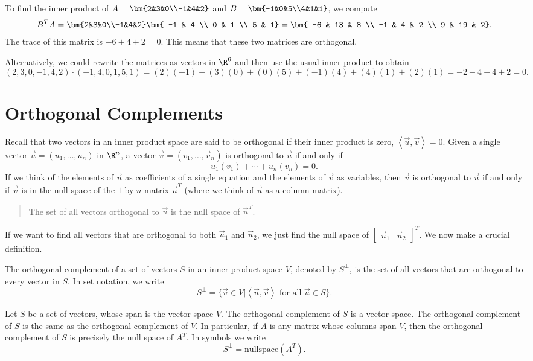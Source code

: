 \begin{example}
To find the inner product of $A=\bm{2&3&0\\-1&4&2}$ and $B=\bm{-1&0&5\\4&1&1}$, we compute 
$$B^TA = \bm{2&3&0\\-1&4&2}\bm{ -1 & 4 \\ 0 & 1 \\ 5 & 1}= \bm{ -6 & 13 & 8 \\ -1 & 4 & 2 \\ 9 & 19 & 2}.$$
The trace of this matrix is $-6 +4 +2 = 0$. This means that these two matrices are orthogonal.

Alternatively, we could rewrite the matrices as vectors in $\R^6$ and then use the usual inner product to obtain $$(2,3,0,-1,4,2)\cdot (-1,4,0,1,5,1) = (2)(-1)+(3)(0)+(0)(5)+(-1)(4)+(4)(1)+(2)(1)= -2-4+4+2 =0.$$
\end{example}






\section{Orthogonal Complements}
Recall that two vectors in an inner product space are said to be orthogonal if their inner product is zero, $\left<\vec u,\vec v\right>=0$.  
Given a single vector $\vec u = (u_1,\ldots,u_n)$ in $\R^n$, a vector $\vec v = (v_1,\ldots,\vec v_n)$ is orthogonal to $\vec u$ if and only if $$u_1(v_1)+\cdots +u_n(v_n)=0.$$ 
If we think of the elements of $\vec u$ as coefficients of a single equation and the elements of $\vec v$ as variables, 
then $\vec v$ is orthogonal to $\vec u$ if and only if $\vec v$ is in the null space of the $1$ by $n$ matrix $\vec u^T$ (where we think of $\vec u$ as a column matrix). 
\begin{quote}
The set of all vectors orthogonal to $\vec u$ is the null space of $\vec u^T$. 
\end{quote}
If we want to find all vectors that are orthogonal to both $\vec u_1$ and $\vec u_2$, we just find the null space of $\begin{bmatrix}\vec u_1&\vec u_2\end{bmatrix}^T$. We now make a crucial definition.

\begin{definition}
The orthogonal complement of a set of vectors $S$ in an inner product space $V$, denoted by $S^\perp$, is the set of all vectors that are orthogonal to every vector in $S$. 
In set notation, we write  
$$S^\perp = \{\vec v\in V | \left<\vec u, \vec v\right> \text{ for all }\vec u\in S\}.$$
\end{definition}
\begin{theorem}
Let $S$ be a set of vectors, whose span is the vector space $V$.  
The orthogonal complement of $S$ is a vector space.
The orthogonal complement of $S$ is the same as the orthogonal complement of $V$.
In particular, if $A$ is any matrix whose columns span $V$, then the orthogonal complement of $S$ is precisely the null space of $A^T$. In symbols we write $$S^\perp = \text{nullspace}(A^T).$$   
\end{theorem}

